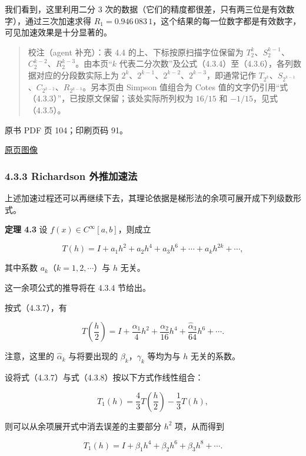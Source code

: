我们看到，这里利用二分 3 次的数据（它们的精度都很差，只有两三位是有效数字），通过三次加速求得 \(R_1=0.946\,083\,1\)，这个结果的每一位数字都是有效数字，可见加速效果是十分显著的。

\begin{quote}
校注（agent 补充）：表 4.4 的上、下标按原扫描字位保留为 \(T_2^k\)、\(S_2^{k-1}\)、\(C_2^{k-2}\)、\(R_2^{k-3}\)。由本页``\(k\) 代表二分次数''及公式（4.3.4）至（4.3.6），各列数据对应的分段数实际上为 \(2^k\)、\(2^{k-1}\)、\(2^{k-2}\)、\(2^{k-3}\)，即通常记作 \(T_{2^k}\)、\(S_{2^{k-1}}\)、\(C_{2^{k-2}}\)、\(R_{2^{k-3}}\)。另本页由 Simpson 值组合为 Cotes 值的文字仍引用``式（4.3.3）''，已按原文保留；该处实际所列权为 \(16/15\) 和 \(-1/15\)，见式（4.3.5）。
\end{quote}

\clearpage

原书 PDF 页 104；印刷页码 91。

\href{source-images/pdf-104.jpeg}{原页图像}

\subsubsection{4.3.3 Richardson 外推加速法}\label{ch04a-richardson-ux5916ux63a8ux52a0ux901fux6cd5}

上述加速过程还可以再继续下去，其理论依据是梯形法的余项可展开成下列级数形式。

\textbf{定理 4.3} 设 \(f(x)\in C^\infty[a,b]\)，则成立

\[
T(h)=I+a_1h^2+a_2h^4+a_3h^6+\cdots+a_kh^{2k}+\cdots,
\tag{4.3.7}
\]

其中系数 \(a_k\)（\(k=1,2,\cdots\)）与 \(h\) 无关。

这一余项公式的推导将在 4.3.4 节给出。

按式（4.3.7），有

\[
T\left(\frac h2\right)=I+\frac{\alpha_1}{4}h^2+\frac{\alpha_2}{16}h^4+\frac{\hat\alpha_3}{64}h^6+\cdots.
\tag{4.3.8}
\]

注意，这里的 \(\hat\alpha_k\) 与将要出现的 \(\beta_k\)，\(\gamma_k\) 等均为与 \(h\) 无关的系数。

设将式（4.3.7）与式（4.3.8）按以下方式作线性组合：

\[
T_1(h)=\frac43T\left(\frac h2\right)-\frac13T(h),
\tag{4.3.9}
\]

则可以从余项展开式中消去误差的主要部分 \(h^2\) 项，从而得到

\[
T_1(h)=I+\beta_1h^4+\beta_2h^6+\beta_3h^8+\cdots.
\tag{4.3.10}
\]

